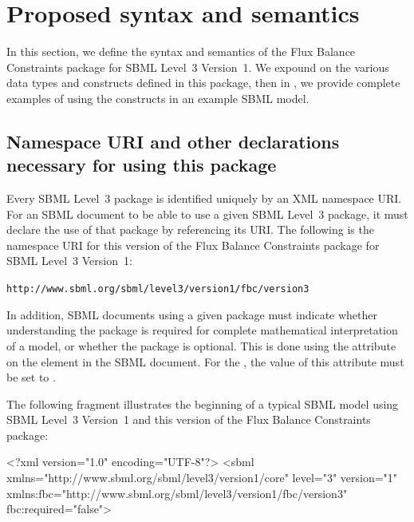 
\section{Proposed syntax and semantics}
\label{syntax}

In this section, we define the syntax and semantics of the Flux Balance
Constraints package for SBML Level~3 Version~1.  We expound on the various
data types and constructs defined in this package, then in ,
we provide complete examples of using the constructs in an example SBML
model.

\subsection{Namespace URI and other declarations necessary for using this
package}
\label{xml-namespace}

Every SBML Level~3 package is identified uniquely by an XML namespace URI.
For an SBML document to be able to use a given SBML Level~3 package, it
must declare the use of that package by referencing its URI.  The following
is the namespace URI for this version of the Flux Balance Constraints
package for SBML Level~3 Version~1:
\begin{center}
\texttt{http://www.sbml.org/sbml/level3/version1/fbc/version3}
\end{center}


In addition, SBML documents using a given package must indicate whether
understanding the package is required for complete mathematical interpretation
of a model, or whether the package is optional.  This is done using the
attribute  on the  element in the SBML document.
For the \FBCPackage, the value of this attribute must be set to .

The following fragment illustrates the beginning of a typical SBML model
using SBML Level~3 Version~1 and this version of the Flux Balance
Constraints package:

\begin{example}
<?xml version="1.0" encoding="UTF-8"?>
<sbml xmlns="http://www.sbml.org/sbml/level3/version1/core" level="3" version="1"
   xmlns:fbc="http://www.sbml.org/sbml/level3/version1/fbc/version3" fbc:required="false">
\end{example}

